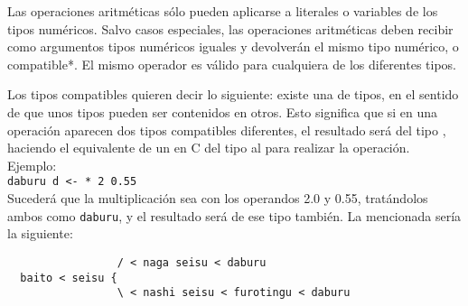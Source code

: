 \documentclass[spanish]{article}
\begin{document}
Las operaciones aritméticas sólo pueden aplicarse a literales o variables de los tipos numéricos. Salvo casos especiales, las operaciones aritméticas deben recibir como argumentos tipos numéricos iguales y devolverán el mismo tipo numérico, o compatible*. El mismo operador es válido para cualquiera de los diferentes tipos.

\text{*} Los tipos compatibles quieren decir lo siguiente: existe una  de tipos, en el sentido de que unos tipos pueden ser contenidos en otros. Esto significa que si en una operación aparecen dos tipos compatibles diferentes, el resultado será del tipo , haciendo el equivalente de un  en C del tipo  al  para realizar la operación. Ejemplo:\\

\texttt{daburu d <- * 2 0.55}\\

Sucederá que la multiplicación sea con los operandos 2.0 y 0.55, tratándolos ambos como \texttt{daburu}, y el resultado será de ese tipo también. La  mencionada sería la siguiente:\\

\begin{lstlisting}
                 / < naga seisu < daburu
  baito < seisu {
                 \ < nashi seisu < furotingu < daburu
\end{lstlisting}
\end{document}
